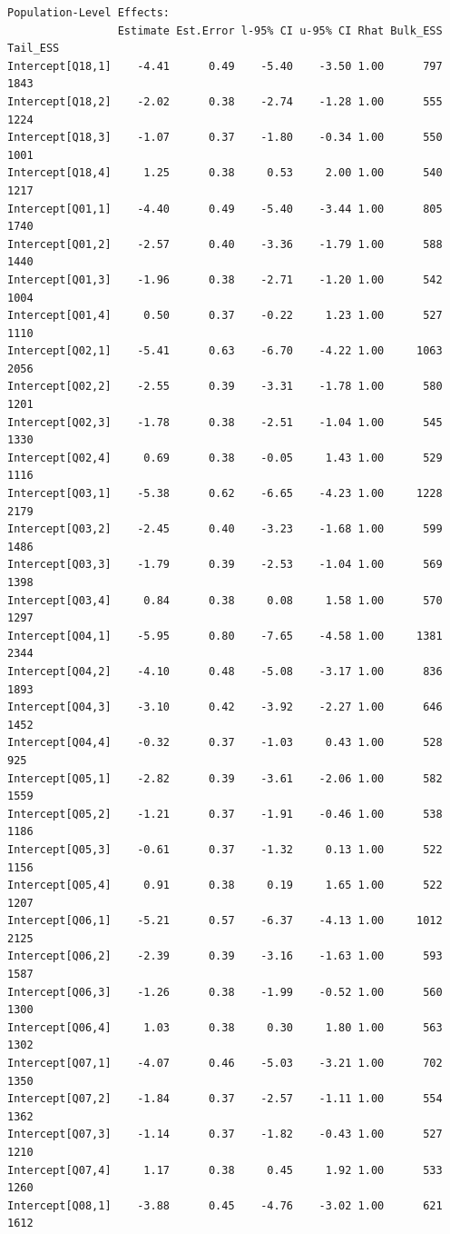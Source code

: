\documentclass[
  12pt,
  a4paper,
  extrafontsizes,
  onecolumn,
  openright]{memoir}
\begin{document}
\begin{verbatim}
Population-Level Effects: 
                 Estimate Est.Error l-95% CI u-95% CI Rhat Bulk_ESS Tail_ESS
Intercept[Q18,1]    -4.41      0.49    -5.40    -3.50 1.00      797     1843
Intercept[Q18,2]    -2.02      0.38    -2.74    -1.28 1.00      555     1224
Intercept[Q18,3]    -1.07      0.37    -1.80    -0.34 1.00      550     1001
Intercept[Q18,4]     1.25      0.38     0.53     2.00 1.00      540     1217
Intercept[Q01,1]    -4.40      0.49    -5.40    -3.44 1.00      805     1740
Intercept[Q01,2]    -2.57      0.40    -3.36    -1.79 1.00      588     1440
Intercept[Q01,3]    -1.96      0.38    -2.71    -1.20 1.00      542     1004
Intercept[Q01,4]     0.50      0.37    -0.22     1.23 1.00      527     1110
Intercept[Q02,1]    -5.41      0.63    -6.70    -4.22 1.00     1063     2056
Intercept[Q02,2]    -2.55      0.39    -3.31    -1.78 1.00      580     1201
Intercept[Q02,3]    -1.78      0.38    -2.51    -1.04 1.00      545     1330
Intercept[Q02,4]     0.69      0.38    -0.05     1.43 1.00      529     1116
Intercept[Q03,1]    -5.38      0.62    -6.65    -4.23 1.00     1228     2179
Intercept[Q03,2]    -2.45      0.40    -3.23    -1.68 1.00      599     1486
Intercept[Q03,3]    -1.79      0.39    -2.53    -1.04 1.00      569     1398
Intercept[Q03,4]     0.84      0.38     0.08     1.58 1.00      570     1297
Intercept[Q04,1]    -5.95      0.80    -7.65    -4.58 1.00     1381     2344
Intercept[Q04,2]    -4.10      0.48    -5.08    -3.17 1.00      836     1893
Intercept[Q04,3]    -3.10      0.42    -3.92    -2.27 1.00      646     1452
Intercept[Q04,4]    -0.32      0.37    -1.03     0.43 1.00      528      925
Intercept[Q05,1]    -2.82      0.39    -3.61    -2.06 1.00      582     1559
Intercept[Q05,2]    -1.21      0.37    -1.91    -0.46 1.00      538     1186
Intercept[Q05,3]    -0.61      0.37    -1.32     0.13 1.00      522     1156
Intercept[Q05,4]     0.91      0.38     0.19     1.65 1.00      522     1207
Intercept[Q06,1]    -5.21      0.57    -6.37    -4.13 1.00     1012     2125
Intercept[Q06,2]    -2.39      0.39    -3.16    -1.63 1.00      593     1587
Intercept[Q06,3]    -1.26      0.38    -1.99    -0.52 1.00      560     1300
Intercept[Q06,4]     1.03      0.38     0.30     1.80 1.00      563     1302
Intercept[Q07,1]    -4.07      0.46    -5.03    -3.21 1.00      702     1350
Intercept[Q07,2]    -1.84      0.37    -2.57    -1.11 1.00      554     1362
Intercept[Q07,3]    -1.14      0.37    -1.82    -0.43 1.00      527     1210
Intercept[Q07,4]     1.17      0.38     0.45     1.92 1.00      533     1260
Intercept[Q08,1]    -3.88      0.45    -4.76    -3.02 1.00      621     1612

\end{verbatim}
\end{document}
